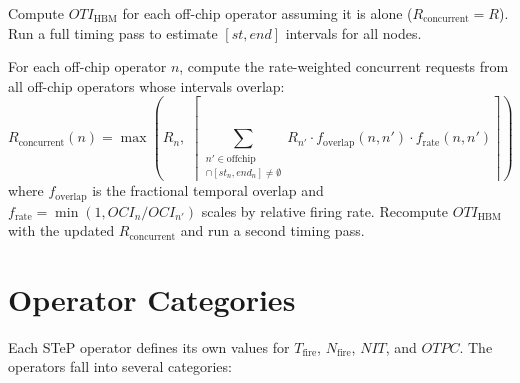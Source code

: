 \documentclass[10pt]{article}
\begin{document}
\begin{description}[leftmargin=1.5em, labelindent=0em]
    \item[Pass~1 (no contention).] Compute $\mathit{OTI}_{\text{HBM}}$ for each off-chip operator assuming it is alone ($R_{\text{concurrent}} = R$). Run a full timing pass to estimate $[\mathit{st}, \textit{end}]$ intervals for all nodes.

    \item[Pass~2 (with contention).] For each off-chip operator $n$, compute the rate-weighted concurrent requests from all off-chip operators whose intervals overlap:
    \begin{equation}
        R_{\text{concurrent}}(n) = \max\!\left(R_n,\; \left\lceil\sum_{\substack{n' \in \text{offchip} \\ [st_{n'}, end_{n'}] \cap [st_n, end_n] \neq \emptyset}} R_{n'} \cdot f_{\text{overlap}}(n, n') \cdot f_{\text{rate}}(n, n')\right\rceil\right)
    \end{equation}
    where $f_{\text{overlap}}$ is the fractional temporal overlap and $f_{\text{rate}} = \min(1, \mathit{OCI}_n / \mathit{OCI}_{n'})$ scales by relative firing rate. Recompute $\mathit{OTI}_{\text{HBM}}$ with the updated $R_{\text{concurrent}}$ and run a second timing pass.
\end{description}

\section{Operator Categories}

Each STeP operator defines its own values for $T_{\text{fire}}$, $N_{\text{fire}}$, $\mathit{NIT}$, and $\mathit{OTPC}$. The operators fall into several categories:
\end{document}
